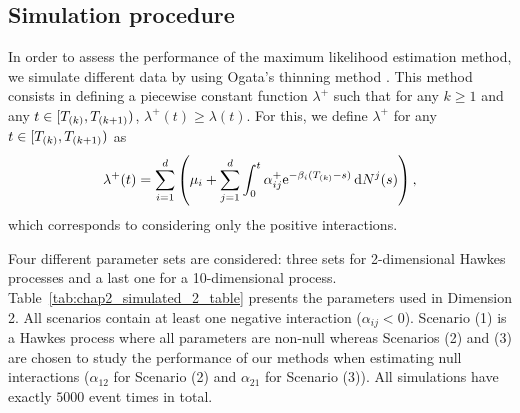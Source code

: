     \subsection{Simulation procedure}
    In order to assess the performance of the maximum likelihood estimation method, we simulate different data by using Ogata's thinning method \parencite{Ogata1981}. This method consists in defining a piecewise constant function $\lambda^+$ such that for any $k\geq1$ and any $t\in[T\park, T\park[k+1])$, $\lambda^+(t) \geq \lambda(t)$. For this, we define $\lambda^+$ for any $t\in[T\park, T\park[k+1])$ as \[\lambda^+(t) = \sum_{i=1}^{d}{\left(\mu_i + \sum_{j=1}^{d}\int_{0}^{t}{\alpha_{ij}^+\mathrm{e}^{-\beta_i(T\park-s)}\,\mathrm{d}N^j(s)}\right)}\,,\] which corresponds to considering only the positive interactions.

    Four different parameter sets are considered: three sets for 2-dimensional Hawkes processes and a last one for a 10-dimensional process.
    Table~\ref{tab:chap2_simulated_2_table} presents the parameters used in Dimension 2. All scenarios contain at least one negative interaction ($\alpha_{ij}<0$). Scenario (1) is a Hawkes process where all parameters are non-null whereas Scenarios (2) and (3) are chosen to study the performance of our methods when estimating null interactions ($\alpha_{12}$ for Scenario (2) and $\alpha_{21}$ for Scenario (3)).
    All simulations have exactly \(5000\) event times in total.
